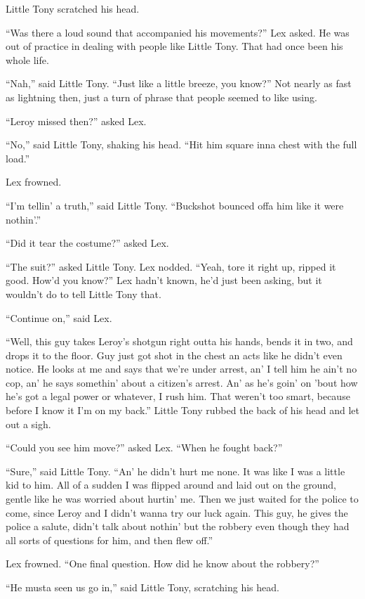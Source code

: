 \documentclass[ebook,12pt]{memoir}
\begin{document}
Little Tony scratched his head.

``Was there a loud sound that accompanied his movements?'' Lex asked. He
was out of practice in dealing with people like Little Tony. That had
once been his whole life.

``Nah,'' said Little Tony. ``Just like a little breeze, you know?'' Not
nearly as fast as lightning then, just a turn of phrase that people
seemed to like using.

``Leroy missed then?'' asked Lex.

``No,'' said Little Tony, shaking his head. ``Hit him square inna chest
with the full load.''

Lex frowned.

``I'm tellin' a truth,'' said Little Tony. ``Buckshot bounced offa him
like it were nothin'.''

``Did it tear the costume?'' asked Lex.

``The suit?'' asked Little Tony. Lex nodded. ``Yeah, tore it right up,
ripped it good. How'd you know?'' Lex hadn't known, he'd just been
asking, but it wouldn't do to tell Little Tony that.

``Continue on,'' said Lex.

``Well, this guy takes Leroy's shotgun right outta his hands, bends it
in two, and drops it to the floor. Guy just got shot in the chest an
acts like he didn't even notice. He looks at me and says that we're
under arrest, an' I tell him he ain't no cop, an' he says somethin'
about a citizen's arrest. An' as he's goin' on 'bout how he's got a
legal power or whatever, I rush him. That weren't too smart, because
before I know it I'm on my back.'' Little Tony rubbed the back of his
head and let out a sigh.

``Could you see him move?'' asked Lex. ``When he fought back?''

``Sure,'' said Little Tony. ``An' he didn't hurt me none. It was like I
was a little kid to him. All of a sudden I was flipped around and laid
out on the ground, gentle like he was worried about hurtin' me. Then we
just waited for the police to come, since Leroy and I didn't wanna try
our luck again. This guy, he gives the police a salute, didn't talk
about nothin' but the robbery even though they had all sorts of
questions for him, and then flew off.''

Lex frowned. ``One final question. How did he know about the robbery?''

``He musta seen us go in,'' said Little Tony, scratching his head.
\end{document}
